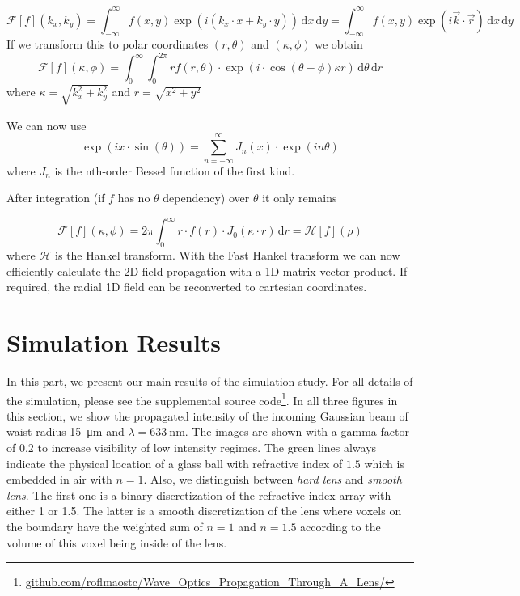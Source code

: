 \documentclass[a4paper,12pt]{article}
\begin{document}
\begin{equation}
\mathcal{F}[f](k_x, k_y) = \int_{-\infty}^{\infty} f(x,y) \exp(i (k_x \cdot x + k_y \cdot y)) \,\mathrm{d}x\, \mathrm{d}y = \int_{-\infty}^{\infty} f(x,y) \exp(i \vec k \cdot \vec r) \,\mathrm{d}x\, \mathrm{d}y
\end{equation}
If we transform this to polar coordinates $(r, \theta)$ and $(\kappa, \phi)$ we obtain
\begin{equation}
\mathcal{F}[f](\kappa, \phi) = \int_{0}^{\infty} \int_{0}^{2\pi} r f(r, \theta)\cdot \exp(i \cdot \cos(\theta - \phi) \kappa r)  \,\mathrm{d}\theta\, \mathrm{d}r
\end{equation}
where $\kappa = \sqrt{k_x^2 + k_y^2}$ and $r=\sqrt{x^2 + y^2}$

We can now use
\begin{equation}
\exp(i x \cdot \sin(\theta)) = \sum_{n=-\infty}^{\infty} J_n(x) \cdot \exp(i n \theta)
\end{equation}
where $J_n$ is the nth-order Bessel function of the first kind.

After integration (if $f$ has no $\theta$ dependency) over $\theta$ it only remains

\begin{equation}
\mathcal{F}[f](\kappa, \phi) = 2\pi \int_{0}^{\infty} r \cdot f(r) \cdot J_0(\kappa \cdot r) \, \mathrm{d}r = \mathcal{H}[f](\rho)
\end{equation}
where $\mathcal{H}$ is the Hankel transform.
With the Fast Hankel transform \cite{Guizar-Sicairos_Gutiérrez-Vega_2004} we can now efficiently calculate the 2D field propagation with a 1D matrix-vector-product. If required, the radial 1D field can be reconverted to cartesian coordinates. 

\section{Simulation Results}
\label{sec:sim}
In this part, we present our main results of the simulation study. For all details of the simulation, please see the supplemental source code\footnote{\url{github.com/roflmaostc/Wave_Optics_Propagation_Through_A_Lens/}}.
In all three figures in this section, we show the propagated intensity of the incoming Gaussian beam of waist radius \SI{15}{\micro\meter} and $\lambda=\SI{633}{\nano\meter}$. The images are shown with a gamma factor of $0.2$ to increase visibility of low intensity regimes. The green lines always indicate the physical location of a glass ball with refractive index of $1.5$ which is embedded in air with $n=1$.
Also, we distinguish between \textit{hard lens} and \textit{smooth lens}. The first one is a binary discretization of the refractive index array with either 1 or 1.5. The latter is a smooth discretization of the lens where voxels on the boundary have the weighted sum of $n=1$ and $n=1.5$ according to the volume of this voxel being inside of the lens.
\end{document}
